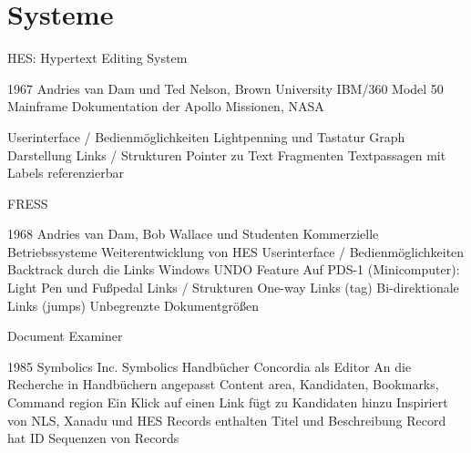 \chapter{Systeme}
\label{ch:Systeme}

\begin{section}{HES: Hypertext Editing System}
\label{sec:HES}

1967
Andries van Dam und Ted Nelson, Brown University
IBM/360 Model 50 Mainframe
Dokumentation der Apollo Missionen, NASA

Userinterface / Bedienmöglichkeiten
Lightpenning und Tastatur
Graph Darstellung
Links / Strukturen
Pointer zu Text Fragmenten
Textpassagen mit Labels referenzierbar
	
	
FRESS

1968
Andries van Dam, Bob Wallace und Studenten
Kommerzielle Betriebssysteme
Weiterentwicklung von HES
Userinterface / Bedienmöglichkeiten
Backtrack durch die Links
Windows
UNDO Feature
Auf PDS-1 (Minicomputer): Light Pen und Fußpedal
Links / Strukturen
One-way Links (tag)
Bi-direktionale Links (jumps)
Unbegrenzte Dokumentgrößen

\end{section}

\begin{section}{Document Examiner}
\label{sec:DocumentExaminer}

1985
Symbolics Inc.
Symbolics Handbücher
Concordia als Editor
An die Recherche in Handbüchern angepasst
Content area, Kandidaten, Bookmarks, Command region
Ein Klick auf einen Link fügt zu Kandidaten hinzu
Inspiriert von NLS, Xanadu und HES
Records enthalten Titel und Beschreibung
Record hat ID
Sequenzen von Records

\end{section}
